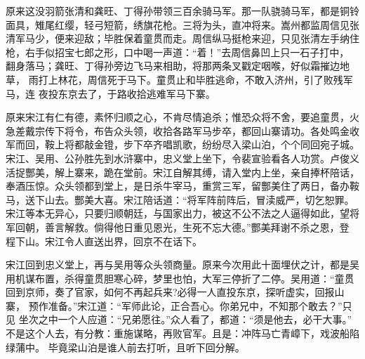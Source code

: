 原来这没羽箭张清和龚旺、丁得孙带领三百余骑马军。那一队骁骑马军，都是铜铃
面具，雉尾红缨，轻弓短箭，绣旗花枪。三将为头，直冲将来。嵩州都监周信见张
清军马少，便来迎敌；毕胜保着童贯而走。周信纵马挺枪来迎，只见张清左手纳住
枪，右手似招宝七郎之形，口中喝一声道：“着！”去周信鼻凹上只一石子打中，
翻身落马；龚旺、丁得孙旁边飞马来相助，将那两条叉戳定咽喉，好似霜摧边地草，
雨打上林花，周信死于马下。童贯止和毕胜逃命，不敢入济州，引了败残军马，连
夜投东京去了，于路收拾逃难军马下寨。

原来宋江有仁有德，素怀归顺之心，不肯尽情追杀；惟恐众将不舍，要追童贯，火
急差戴宗传下将令，布告众头领，收拾各路军马步卒，都回山寨请功。各处鸣金收
军而回，鞍上将都敲金镫，步下卒齐唱凯歌，纷纷尽入梁山泊，个个同回宛子城。
宋江、吴用、公孙胜先到水浒寨中，忠义堂上坐下，令裴宣验看各人功赏。卢俊义
活捉酆美，解上寨来，跪在堂前。宋江自解其缚，请入堂内上坐，亲自捧杯陪话，
奉酒压惊。众头领都到堂上，是日杀牛宰马，重赏三军，留酆美住了两日，备办鞍
马，送下山去。酆美大喜。宋江陪话道：“将军阵前阵后，冒渎威严，切乞恕罪。
宋江等本无异心，只要归顺朝廷，与国家出力，被这不公不法之人逼得如此，望将
军回朝，善言解救。倘得他日重见恩光，生死不忘大德。”酆美拜谢不杀之恩，登
程下山。宋江令人直送出界，回京不在话下。

宋江回到忠义堂上，再与吴用等众头领商量。原来今次用此十面埋伏之计，都是吴
用机谋布置，杀得童贯胆寒心碎，梦里也怕，大军三停折了二停。吴用道：“童贯
回到京师，奏了官家，如何不再起兵来?必得一人直投东京，探听虚实，回报山寨，
预作准备。”宋江道：“军师此论，正合吾心。你弟兄中，不知那个敢去？”只见
坐次之中一个人应道：“兄弟愿往。”众人看了，都道：“须是他去，必干大事。”
不是这个人去，有分教：重施谋略，再败官军。且是：冲阵马亡青嶂下，戏波船陷
绿蒲中。
毕竟梁山泊是谁人前去打听，且听下回分解。